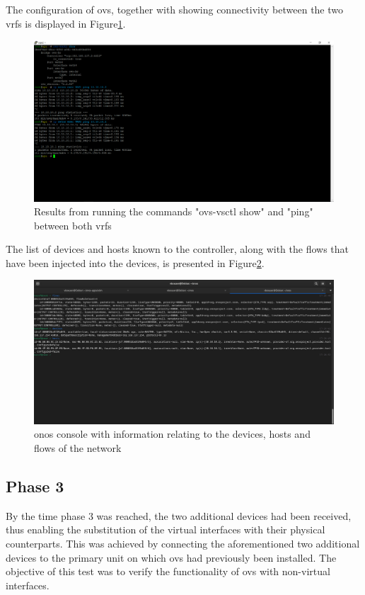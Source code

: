 The configuration of \gls{ovs}, together with showing connectivity between the two \glspl{vrf} is displayed in Figure\ref{fig:exp1_phase2_pings}.

\begin{figure}
	\centering
	\includegraphics[width=\textwidth]{Chapters/Figures/tests/ovs_phase_2/ovs_config_&_pings.PNG}
	\caption{Results from running the commands "ovs-vsctl show" and "ping" between both \glspl{vrf}}
	\label{fig:exp1_phase2_pings}
\end{figure}

The list of devices and hosts known to the controller, along with the flows that have been injected into the devices, is presented in Figure\ref{fig:exp1_phase2_onos}.

\begin{figure}
	\centering
	\includegraphics[width=\textwidth]{Chapters/Figures/tests/ovs_phase_2/onos_topology_&_more.PNG}
	\caption{\gls{onos} console with information relating to the devices, hosts and flows of the network}
	\label{fig:exp1_phase2_onos}
\end{figure}

\subsection{Phase 3}
By the time phase 3 was reached, the two additional devices had been received, thus enabling the substitution of the virtual interfaces with their physical counterparts. This was achieved by connecting the aforementioned two additional devices to the primary unit on which \gls{ovs} had previously been installed. The objective of this test was to verify the functionality of \gls{ovs} with non-virtual interfaces.


